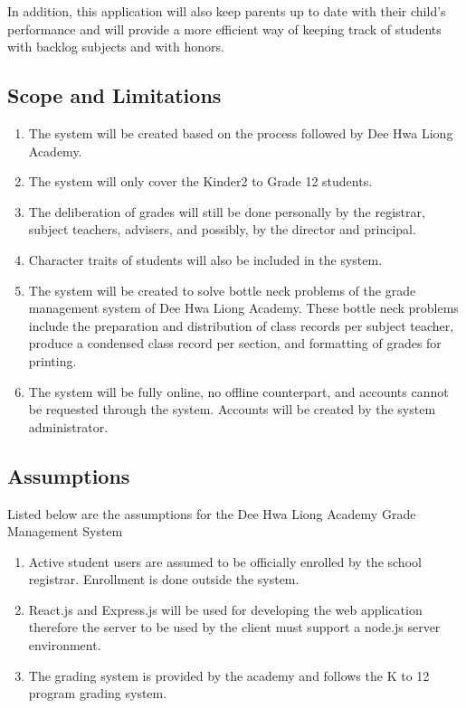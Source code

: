 \documentclass[11pt,a4paper,titlepage]{article}
\begin{document}
In addition, this application will also keep parents up to date with their child's performance and will provide a more efficient way of keeping track of students with backlog subjects and with honors.

\subsection{Scope and Limitations}
\begin{enumerate}
	\item The system will be created based on the process followed by Dee Hwa Liong Academy.
	\item The system will only cover the Kinder2 to Grade 12 students.
	\item The deliberation of grades will still be done personally by the registrar, subject teachers, advisers, and possibly, by the director and principal.
	\item Character traits of students will also be included in the system.
	\item The system will be created to solve bottle neck problems of the grade management system of Dee Hwa Liong Academy. These bottle neck problems include the preparation and distribution of class records per subject teacher, produce a condensed class record per section, and formatting of grades for printing.
	\item The system will be fully online, no offline counterpart, and accounts cannot be requested through the system. Accounts will be created by the system administrator.
\end{enumerate}

\subsection{Assumptions}
Listed below are the assumptions for the Dee Hwa Liong Academy Grade Management System
\begin{enumerate}
	\item Active student users are assumed to be officially enrolled by the school registrar. Enrollment is done outside the system.
	\item React.js and Express.js will be used for developing the web application therefore the server to be used by the client must support a node.js server environment.
	\item The grading system is provided by the academy and follows the K to 12 program grading system.
\end{enumerate}
\end{document}
